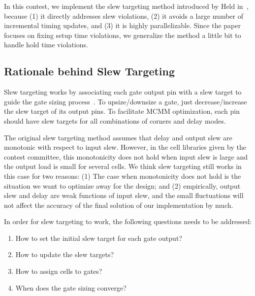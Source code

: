 In this contest, we implement the slew targeting method introduced by Held in~\cite{Held:Gate}, because (1) it directly addresses slew violations, (2) it avoids a large number of incremental timing updates, and (3) it is highly parallelizable. Since the paper focuses on fixing setup time violations, we generalize the method a little bit to handle hold time violations.


\subsection{Rationale behind Slew Targeting}

Slew targeting works by associating each gate output pin with a slew target to guide the gate sizing process~\cite{Held:Gate}. To upsize/downsize a gate, just decrease/increase the slew target of its output pins. To facilitate MCMM optimization, each pin should have slew targets for all combinations of corners and delay modes.

The original slew targeting method assumes that delay and output slew are monotonic with respect to input slew. However, in the cell libraries given by the contest committee, this monotonicity does not hold when input slew is large and the output load is small for several cells. We think slew targeting still works in this case for two reasons: (1) The case when monotonicity does not hold is the situation we want to optimize away for the design; and (2) empirically, output slew and delay are weak functions of input slew, and the small fluctuations will not affect the accuracy of the final solution of our implementation by much.

In order for slew targeting to work, the following questions needs to be addressed:
\begin{enumerate}
\item How to set the initial slew target for each gate output?
\item How to update the slew targets?
\item How to assign cells to gates?
\item When does the gate sizing converge?
\end{enumerate}

